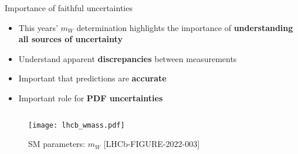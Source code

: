\begin{frame}[t]{Importance of faithful uncertainties}
  \begin{itemize}
    \item This years' $m_W$ determination highlights the importance of {\bf understanding all sources of uncertainty}
    \item Understand apparent {\bf discrepancies} between measurements
    \item Important that predictions are {\bf accurate}
    \item<2-> Important role for {\bf PDF uncertainties}
  \end{itemize}
  \vspace*{-0.5cm}
  \begin{columns}[t]
    \begin{column}{0.49\textwidth}
      \begin{figure}
        \centering
        \texttt{[image: lhcb\_wmass.pdf]}
        \caption*{SM parameters: $m_W$ [LHCb-FIGURE-2022-003]}
      \end{figure}
    \end{column}
    \begin{column}{0.49\textwidth}
      \vspace*{-1.1cm}
    \end{column}
  \end{columns}
\end{frame}


